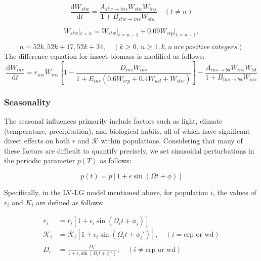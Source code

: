 \documentclass{HZNUMCM}
\begin{document}
        \begin{equation}
          \frac{\mathrm{d}W_{stw}}{\mathrm{d}t} = \frac{A_{stw\rightarrow ins} W_{stw} W_{ins}}{1 + B_{stw\rightarrow ins} W_{stw}} \quad (t \neq n)
        \end{equation}

        \begin{equation}
          W_{stw}|_{t=n} = W_{stw}|_{t=n-1} + 0.09 W_{crp}|_{t=n-1},
        \end{equation}
        
        \begin{equation}
          n = 52k, 52k+17, 52k+34, \quad (k \geqslant 0, \, n \geqslant 1, k,n\ are\ positive\ integers)
        \end{equation}
        The difference equation for insect biomass is modified as follows:
        \begin{equation}
          \frac{\mathrm{d}W_{ins}}{\mathrm{d}t} = r_{ins} W_{ins} \left[ 1 - \frac{D_{ins} W_{ins}}{1 + E_{ins} \left( 0.6 W_{crp} + 0.4 W_{wd} + W_{stw} \right)} \right] - \frac{A_{ins\rightarrow bd} W_{ins} W_{bd}}{1 + B_{ins\rightarrow bd} W_{ins}}
        \end{equation}

      \subsubsection{Seasonality}
        The seasonal influences primarily include factors such as light, 
        climate (temperature, precipitation), and biological habits, 
        all of which have significant direct effects on both $r$ and $\mathscr{K}$ within populations. 
        Considering that many of these factors are difficult to quantify precisely, 
        we set sinusoidal perturbations in the periodic parameter $p(T)$ as follows\cite{GAKKHAR20061239}:

        \begin{equation}
          p(t) = \bar{p} \left[ 1 + \epsilon \sin (\Omega t + \phi) \right]
        \end{equation}

        Specifically, in the LV-LG model mentioned above, 
        for population $i$, the values of $r_i$ and $K_i$ are defined as follows:

        \begin{align}
          r_i &= \bar{r}_i \left[ 1 + \epsilon_i \sin \left( \Omega_i t + \phi_i \right) \right] \\
          \mathscr{K}_i &= \bar{\mathscr{K}}_i \left[ 1 + \epsilon_i \sin \left( \Omega_i t + \phi_i' \right) \right], \quad \left( i = \text{crp or wd} \right) \\
          D_i &= \frac{\bar{D}_i'}{1 + \epsilon_i \sin \left( \Omega_i t + \phi_i' \right)}, \quad \left( i \neq \text{crp or wd} \right)
        \end{align}
\end{document}
